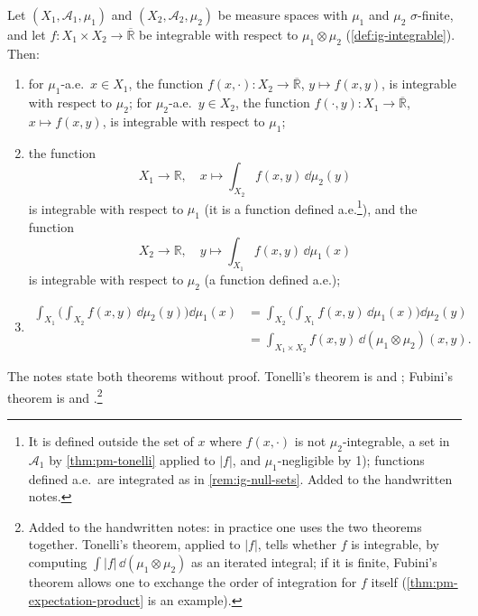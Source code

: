 \begin{theorem}[Fubini]\label{thm:pm-fubini}
Let $(X_1,\mathcal A_1,\mu_1)$ and $(X_2,\mathcal A_2,\mu_2)$ be measure spaces with $\mu_1$
and $\mu_2$ $\sigma$-finite, and let $f:X_1\times X_2\to\overline{\mathbb R}$ be integrable
with respect to $\mu_1\otimes\mu_2$ (\cref{def:ig-integrable}). Then:
\begin{enumerate}[label=\arabic*)]
  \item for $\mu_1$-a.e.\ $x\in X_1$, the function $f(x,\cdot):X_2\to\overline{\mathbb R}$,
    $y\mapsto f(x,y)$, is integrable with respect to $\mu_2$; for $\mu_2$-a.e.\ $y\in X_2$, the
    function $f(\cdot,y):X_1\to\overline{\mathbb R}$, $x\mapsto f(x,y)$, is integrable with
    respect to $\mu_1$;
  \item the function
    \[
      X_1\to\mathbb R,\quad x\mapsto\int_{X_2}f(x,y)\,\dd\mu_2(y)
    \]
    is integrable with respect to $\mu_1$ (it is a function defined
    a.e.\footnote{It is defined outside the set of $x$ where $f(x,\cdot)$ is not
    $\mu_2$-integrable, a set in $\mathcal A_1$ by \cref{thm:pm-tonelli} applied to $|f|$, and
    $\mu_1$-negligible by 1); functions defined a.e.\ are integrated as in
    \cref{rem:ig-null-sets}. Added to the handwritten notes.}), and the function
    \[
      X_2\to\mathbb R,\quad y\mapsto\int_{X_1}f(x,y)\,\dd\mu_1(x)
    \]
    is integrable with respect to $\mu_2$ (a function defined a.e.);
  \item
    \[
    \begin{aligned}
      \int_{X_1}\Big(\int_{X_2}f(x,y)\,\dd\mu_2(y)\Big)\dd\mu_1(x)
      &=\int_{X_2}\Big(\int_{X_1}f(x,y)\,\dd\mu_1(x)\Big)\dd\mu_2(y)\\
      &=\int_{X_1\times X_2}f(x,y)\,\dd(\mu_1\otimes\mu_2)(x,y).
    \end{aligned}
    \]
\end{enumerate}
\end{theorem}

The notes state both theorems without proof. Tonelli's theorem is
\citet[Theorem~18.1(ii) and Theorem~18.3, first part]{billingsley} and
\citet[Theorem~8.8(a)]{rudin-rca}; Fubini's theorem is \citet[Theorem~18.3, second
part]{billingsley} and \citet[Theorem~8.8(c)]{rudin-rca}.\footnote{Added to the handwritten
notes: in practice one uses the two theorems together. Tonelli's theorem, applied to $|f|$,
tells whether $f$ is integrable, by computing $\int|f|\,\dd(\mu_1\otimes\mu_2)$ as an iterated
integral; if it is finite, Fubini's theorem allows one to exchange the order of integration
for $f$ itself (\cref{thm:pm-expectation-product} is an example).}

